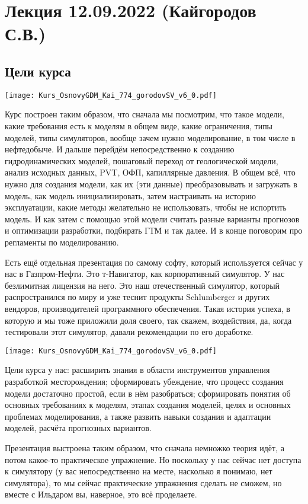\documentclass[main.tex]{subfiles}
\begin{document}
\section{Лекция 12.09.2022 (Кайгородов С.В.)}

\subsection{Цели курса}

\texttt{[image: Kurs\_OsnovyGDM\_Kai\_774\_gorodovSV\_v6\_0.pdf]}

Курс построен таким образом, что сначала мы посмотрим, что такое модели, какие требования есть к моделям в общем виде, какие ограничения, типы моделей, типы симуляторов, вообще зачем нужно моделирование, в том числе в нефтедобыче.
И дальше перейдём непосредственно к созданию гидродинамических моделей, пошаговый переход от геологической модели, анализ исходных данных, PVT, ОФП, капиллярные давления.
В общем всё, что нужно для создания модели, как их (эти данные) преобразовывать и загружать в модель, как модель инициализировать, затем настраивать на историю эксплуатации, какие методы желательно не использовать, чтобы не испортить модель.
И как затем с помощью этой модели считать разные варианты прогнозов и оптимизации разработки, подбирать ГТМ и так далее.
И в конце поговорим про регламенты по моделированию.

Есть ещё отдельная презентация по самому софту, который используется сейчас у нас в Газпром-Нефти.
Это т-Навигатор, как корпоративный симулятор.
У нас безлимитная лицензия на него.
Это наш отечественный симулятор, который распространился по миру и уже теснит продукты Schlumberger и других вендоров, производителей программного обеспечения.
Такая история успеха, в которую и мы тоже приложили доля своего, так скажем, воздействия, да, когда тестировали этот симулятор, давали рекомендации по его доработке.

\texttt{[image: Kurs\_OsnovyGDM\_Kai\_774\_gorodovSV\_v6\_0.pdf]}

Цели курса у нас: расширить знания в области инструментов управления разработкой месторождения; сформировать убеждение, что процесс создания модели достаточно простой, если в нём разобраться; сформировать понятия об основных требованиях к моделям, этапах создания моделей, целях и основных проблемах моделирования, а также развить навыки создания и адаптации моделей, расчёта прогнозных вариантов.

Презентация выстроена таким образом, что сначала немножко теория идёт, а потом какое-то практическое упражнение.
Но поскольку у нас сейчас нет доступа к симулятору (у вас непосредственно на месте, насколько я понимаю, нет симулятора), то мы сейчас практические упражнения сделать не сможем, но вместе с Ильдаром вы, наверное, это всё проделаете.
\end{document}
